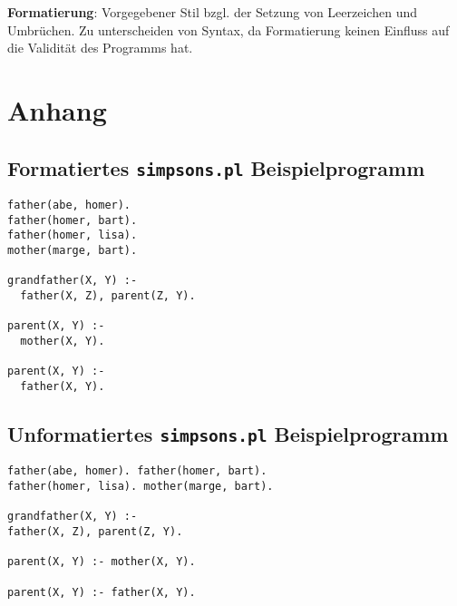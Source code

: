 \documentclass[parskip=full,11pt,twoside]{scrartcl}
\begin{document}
\textbf{Formatierung}:
Vorgegebener Stil bzgl. der Setzung von Leerzeichen und Umbrüchen. Zu unterscheiden von Syntax, da Formatierung keinen Einfluss auf die Validität des Programms hat.

\newpage
\section{Anhang}

\subsection{Formatiertes \texttt{simpsons.pl} Beispielprogramm}

\begin{lstlisting}
father(abe, homer).
father(homer, bart).
father(homer, lisa).
mother(marge, bart).

grandfather(X, Y) :-
  father(X, Z), parent(Z, Y).

parent(X, Y) :-
  mother(X, Y).

parent(X, Y) :-
  father(X, Y).
\end{lstlisting}

\subsection{Unformatiertes \texttt{simpsons.pl} Beispielprogramm}

\begin{lstlisting}
father(abe, homer). father(homer, bart).
father(homer, lisa). mother(marge, bart).

grandfather(X, Y) :-
father(X, Z), parent(Z, Y).

parent(X, Y) :- mother(X, Y).

parent(X, Y) :- father(X, Y).
\end{lstlisting}
\end{document}
